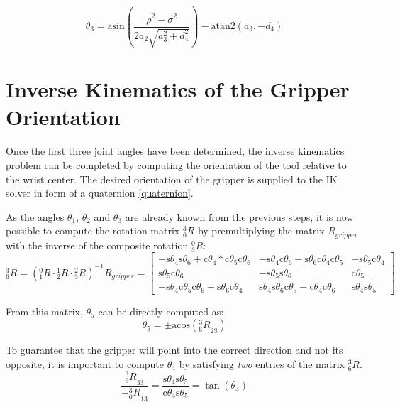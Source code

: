 \documentclass[twoside]{article}
\renewcommand{\c}{\text{c}}
\newcommand{\s}{\text{s}}
\newcommand{\R}[2]{\mbox{$_{#2}^{#1}{R}$}}
\newcommand{\acos}{\text{acos}}
\begin{document}
\begin{equation}
  \theta_3 = \text{asin}\left(\frac{\rho^2 - \sigma^2}{2 a_2 \sqrt{a_3^2 + d_4^2}}\right) - \text{atan2}(a_3, -d_4)
\end{equation}

\section{Inverse Kinematics of the Gripper Orientation}
Once the first three joint angles have been determined, the inverse kinematics problem can be
completed by computing the orientation of the tool relative to the wrist center. The desired
orientation of the gripper is supplied to the IK solver in form of a quaternion \ref{quaternion}.



As the angles $\theta_1$, $\theta_2$ and $\theta_3$ are already known from the previous steps,
it is now possible to compute the rotation matrix $\R{3}{6}$ by premultiplying the matrix $R_{gripper}$
with the inverse of the composite rotation $\R{0}{3}$:
\begin{equation}
  \R{3}{6} = (\R{0}{1}\cdot \R{1}{2}\cdot \R{2}{3})^{-1} R_{gripper} =
  \begin{bmatrix}
    -\s\theta_4 \s\theta_6 + \c\theta_4*\c\theta_5 \c\theta_6 & -\s\theta_4 \c\theta_6 - \s\theta_6 \c\theta_4 \c\theta_5 & -\s\theta_5 \c\theta_4 \\
                                        \s\theta_5 \c\theta_6 &                                    -\s\theta_5 \s\theta_6 &             \c\theta_5 \\
    -\s\theta_4 \c\theta_5 \c\theta_6 - \s\theta_6 \c\theta_4 &  \s\theta_4 \s\theta_6 \c\theta_5 - \c\theta_4 \c\theta_6 &  \s\theta_4 \s\theta_5
  \end{bmatrix}
\end{equation}

From this matrix, $\theta_5$ can be directly computed as:
\begin{equation}
  \theta_5 = \pm\acos(\R{3}{6}_{23})
\end{equation}

To guarantee that the gripper will point into the correct direction and not its opposite,
it is important to compute $\theta_4$  by satisfying \emph{two} entries of the matrix
$\R{3}{6}$.
\begin{equation}
  \frac{\R{3}{6}_{33}}{-\R{3}{6}_{13}} = \frac{\s\theta_4\s\theta_5}{\c\theta_4\s\theta_5} = \tan(\theta_4)
\end{equation}
\end{document}
